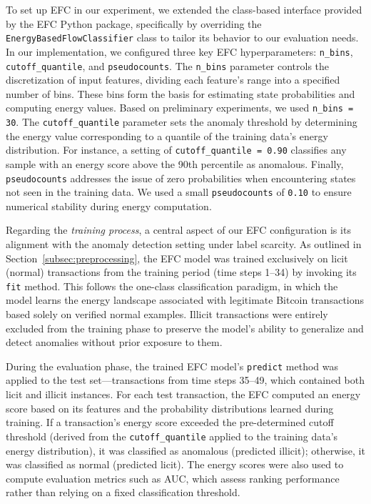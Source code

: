 \documentclass[12pt]{article}
\begin{document}
To set up EFC in our experiment, we extended the class-based interface provided by the EFC Python package, specifically
by overriding the \texttt{EnergyBasedFlowClassifier} class to tailor its behavior to our evaluation needs. In our implementation,
we configured three key EFC hyperparameters: \texttt{n\_bins}, \texttt{cutoff\_quantile}, and \texttt{pseudocounts}.
The \texttt{n\_bins} parameter controls the discretization of input features, dividing each feature's range into a specified
number of bins. These bins form the basis for estimating state probabilities and computing energy values. Based on preliminary
experiments, we used \texttt{n\_bins = 30}. The \texttt{cutoff\_quantile} parameter sets the anomaly threshold by determining
the energy value corresponding to a quantile of the training data's energy distribution. For instance, a setting of
\texttt{cutoff\_quantile = 0.90} classifies any sample with an energy score above the 90th percentile as anomalous.
Finally, \texttt{pseudocounts} addresses the issue of zero probabilities when encountering states not seen in the training
data. We used a small \texttt{pseudocounts} of \texttt{0.10} to ensure numerical stability during energy computation.

Regarding the \emph{training process}, a central aspect of our EFC configuration is its alignment with the anomaly detection
setting under label scarcity. As outlined in Section~\ref{subsec:preprocessing}, the EFC model was trained exclusively on
licit (normal) transactions from the training period (time steps 1--34) by invoking its \texttt{fit} method. This follows
the one-class classification paradigm, in which the model learns the energy landscape associated with legitimate Bitcoin
transactions based solely on verified normal examples. Illicit transactions were entirely excluded from the training phase
to preserve the model's ability to generalize and detect anomalies without prior exposure to them.

During the evaluation phase, the trained EFC model's \texttt{predict} method was applied to the test set---transactions
from time steps 35--49, which contained both licit and illicit instances. For each test transaction, the EFC computed an
energy score based on its features and the probability distributions learned during training. If a transaction's energy
score exceeded the pre-determined cutoff threshold (derived from the \texttt{cutoff\_quantile} applied to the training data's
energy distribution), it was classified as anomalous (predicted illicit); otherwise, it was classified as normal (predicted licit).
The energy scores were also used to compute evaluation metrics such as AUC, which assess ranking performance rather than
relying on a fixed classification threshold.
\end{document}
